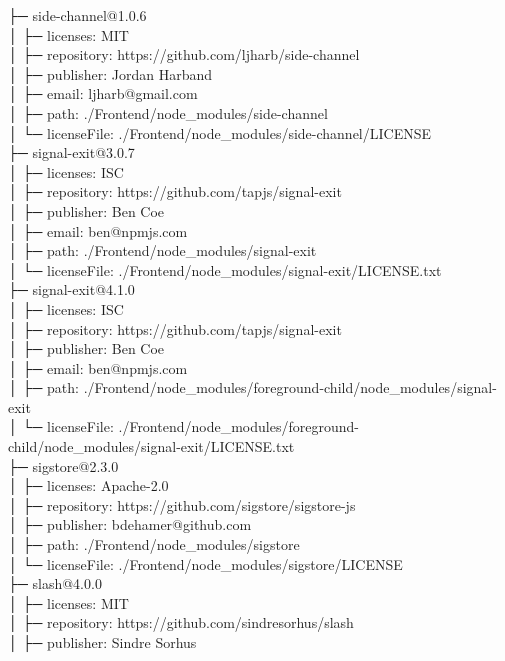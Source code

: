 \documentclass[
    paper=a4,
    twoside=false,
    parskip=half,
    listof=entryprefix,
    listof=totoc,
    index=totoc,
    bibliography=totoc,
    headsepline,
]{scrbook}
\begin{document}
    ├─ side-channel@1.0.6\\
    │  ├─ licenses: MIT\\
    │  ├─ repository: https://github.com/ljharb/side-channel\\
    │  ├─ publisher: Jordan Harband\\
    │  ├─ email: ljharb@gmail.com\\
    │  ├─ path: ./Frontend/node\_modules/side-channel\\
    │  └─ licenseFile: ./Frontend/node\_modules/side-channel/LICENSE\\
    ├─ signal-exit@3.0.7\\
    │  ├─ licenses: ISC\\
    │  ├─ repository: https://github.com/tapjs/signal-exit\\
    │  ├─ publisher: Ben Coe\\
    │  ├─ email: ben@npmjs.com\\
    │  ├─ path: ./Frontend/node\_modules/signal-exit\\
    │  └─ licenseFile: ./Frontend/node\_modules/signal-exit/LICENSE.txt\\
    ├─ signal-exit@4.1.0\\
    │  ├─ licenses: ISC\\
    │  ├─ repository: https://github.com/tapjs/signal-exit\\
    │  ├─ publisher: Ben Coe\\
    │  ├─ email: ben@npmjs.com\\
    │  ├─ path: ./Frontend/node\_modules/foreground-child/node\_modules/signal-exit\\
    │  └─ licenseFile: ./Frontend/node\_modules/foreground-child/node\_modules/signal-exit/LICENSE.txt\\
    ├─ sigstore@2.3.0\\
    │  ├─ licenses: Apache-2.0\\
    │  ├─ repository: https://github.com/sigstore/sigstore-js\\
    │  ├─ publisher: bdehamer@github.com\\
    │  ├─ path: ./Frontend/node\_modules/sigstore\\
    │  └─ licenseFile: ./Frontend/node\_modules/sigstore/LICENSE\\
    ├─ slash@4.0.0\\
    │  ├─ licenses: MIT\\
    │  ├─ repository: https://github.com/sindresorhus/slash\\
    │  ├─ publisher: Sindre Sorhus\\
\end{document}
